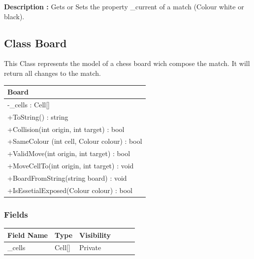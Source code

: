 \documentclass[12pt]{article}
\begin{document}
\textbf{Description :} Gets or Sets the property \_current of a match (Colour white or black).

\newpage


\subsection{Class Board}

This Class represents the model of a chess board wich compose the
match. It will return all changes to the match.

\begin{table}[H]
    \begin{tabular}{|l|}
    \hline
    \rowcolor[HTML]{C0C0C0} 
    \textbf{Board}                              \\ \hline
    \rowcolor[HTML]{EFEFEF}                     
    -\_cells : Cell[]                           \\ \hline
    +ToString() : string                        \\ \hline
    +Collision(int origin, int target) : bool   \\ \hline
    +SameColour (int cell, Colour colour) : bool\\ \hline
    +ValidMove(int origin, int target) : bool   \\ \hline
    +MoveCellTo(int origin, int target) : void  \\ \hline
    +BoardFromString(string board) : void       \\ \hline
    +IsEssetialExposed(Colour colour) : bool
    \end{tabular}
\end{table}

\subsubsection{Fields}

\begin{table}[H]
    \begin{tabular}{llllll}
    \hline
    \multicolumn{1}{|l|}{\cellcolor[HTML]{EFEFEF}\textbf{Field Name}} & \multicolumn{1}{l|}{\cellcolor[HTML]{EFEFEF}\textbf{Type}} & \multicolumn{1}{l|}{\cellcolor[HTML]{EFEFEF}\textbf{Visibility}} \\ \hline
    \multicolumn{1}{|l|}{\_cells}                                     & \multicolumn{1}{l|}{Cell[]}                                & \multicolumn{1}{l|}{Private}                                     \\ \hline
    \end{tabular}
\end{table}
\end{document}

